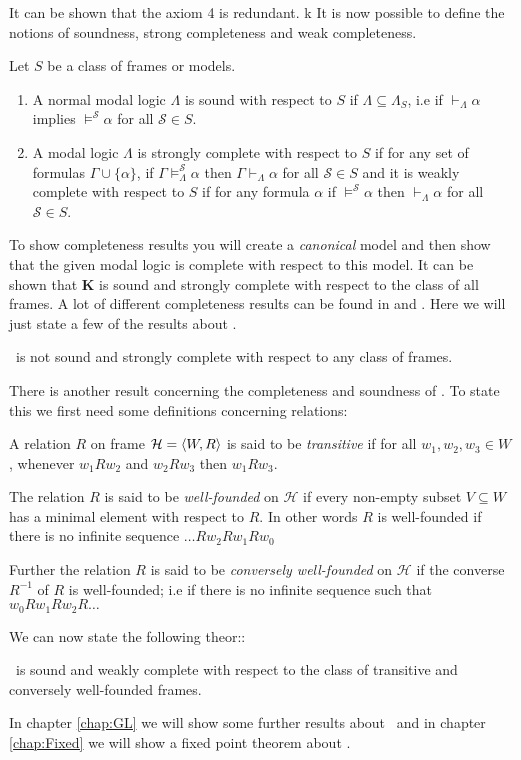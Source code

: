 \documentclass[../main.tex]{subfiles}
\begin{document}
It can be shown that the axiom 4 is redundant. k
It is now possible to define the notions of soundness, strong completeness and
weak completeness.
\begin{defi}
	Let $S$ be a class of frames or models.
	\begin{enumerate}
		\item A normal modal logic $\Lambda$ is sound with respect to $S$ if
		$\Lambda\subseteq\Lambda_S$, i.e if $\vdash_\Lambda\alpha$
		implies $\vDash^\mathcal{S}\alpha$ for all $\mathcal{S}\in S$.
	\item A modal logic $\Lambda$ is strongly complete with respect to $S$
		if for any set of formulas $\Gamma\cup\{\alpha\}$, if
		$\Gamma\vDash^\mathcal{S}_\Lambda\alpha$ then
		$\Gamma\vdash_\Lambda\alpha$ for all $\mathcal{S}\in S$ and it
		is weakly complete with respect to $S$ if for any formula
		$\alpha$ if $\vDash^\mathcal{S}\alpha$ then
		$\vdash_\Lambda\alpha$ for all $\mathcal{S}\in S$.
	\end{enumerate}
\end{defi}
To show completeness results you will create a \textit{canonical} model and
then show that the given modal logic is complete with respect to this model. It
can be shown that \textbf{K} is sound and strongly complete with respect to the
class of all frames. A lot of different completeness results can be found in
\cite{Lemmon1977} and \cite{Blackburn2002}. Here we will just state a few of
the results about \GL.

\begin{thm}
	\GL\ is not sound and strongly complete with respect to any class of
	frames.
\end{thm}

There is another result concerning the completeness and soundness of \GL. To
state this we first need some definitions concerning relations:
\begin{defi}
	A relation $R$ on frame $\mathcal{H}=\langle W,R\rangle$ is said to be
	\textit{transitive} if for all $w_1,w_2,w_3\in W$, whenever $w_1Rw_2$
	and $w_2Rw_3$ then $w_1Rw_3$.
	
	The relation $R$ is said to be \textit{well-founded} on
	$\mathcal{H}$ if every non-empty  subset $V\subseteq W$ has a minimal
	element with respect to $R$. In other words $R$ is well-founded if
	there is no infinite sequence $\ldots Rw_2Rw_1Rw_0$

	Further the relation $R$ is said to be \textit{conversely well-founded}
	on $\mathcal{H}$ if the converse $R^{-1}$ of $R$ is well-founded; i.e
	if there is no infinite sequence such that $w_0Rw_1Rw_2R\ldots$
\end{defi}
We can now state the following theor::
\begin{thm}
	\label{thm:GLcomplete}
	\GL\ is sound and weakly complete with respect to the class of
	transitive and conversely well-founded frames.
\end{thm}
In chapter \ref{chap:GL} we will show some further results about \GL\ and in
chapter
\ref{chap:Fixed} we will show a fixed point theorem about \GL.
\end{document}
